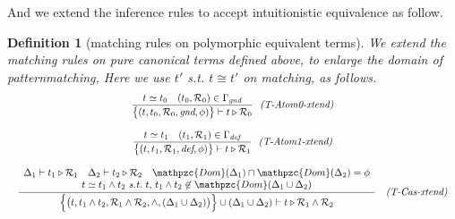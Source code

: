 \documentclass[12pt]{article}
\newtheorem{Definition}{Definition}[section]
\begin{document}
And we extend the inference rules to accept intuitionistic equivalence
as follow.

\begin{Definition}[matching rules on polymorphic equivalent terms]
  We extend the matching rules on pure canonical terms defined above, to
  enlarge the domain of patternmatching,
  Here we use $t'$ s.t. $t \cong t'$ on matching, as follows.
  \begin{displaymath}
    \begin{array}{c}
      
      \begin{array}{rl}
        \dfrac{
          t \simeq t_0
           \quad (t_0, \mathcal{R}_0) \in \Gamma_\text{\it gnd}
        }{
          \bigl\{(t, t_0, \mathcal{R}_0, \text{\it gnd}, \phi ) \bigr\}
           \vdash t \triangleright \mathcal{R}_0
        }  &  \!\!\text{\it (T-Atom0-xtend)}
      \end{array}  \\
      \\
      
      \begin{array}{rl}
        \dfrac{
          t \simeq t_1
           \quad (t_1, \mathcal{R}_1) \in \Gamma_\text{\it def}
        }{
          \bigl\{(t, t_1, \mathcal{R}_1, \text{\it def}, \phi ) \bigr\}
           \vdash t \triangleright \mathcal{R}_1
        }  &  \!\!\text{\it (T-Atom1-xtend)}
      \end{array}  \\
      \\
      
      \begin{array}{rl}
        \dfrac{
          \begin{array}{c}
            \Delta_1 \vdash t_1 \triangleright \mathcal{R}_1
            \quad \Delta_2 \vdash t_2 \triangleright \mathcal{R}_2
            \quad \mathpzc{Dom}(\Delta_1) \cap \mathpzc{Dom}(\Delta_2)
            = \phi  \\
            t \simeq t_1 \wedge t_2\
            \text{\it s.t.}\ t,\, t_1 \wedge t_2 \not\in \mathpzc{Dom}(
            \Delta_1 \cup \Delta_2)
          \end{array}
        }{
          \Bigl\{\bigl(t, t_1 \wedge t_2,
          \mathcal{R}_1 \wedge \mathcal{R}_2, \wedge,
          (\Delta_1 \cup \Delta_2) \bigr) \Bigr\}
          \cup (\Delta_1 \cup \Delta_2) \vdash
          t \triangleright \mathcal{R}_1 \wedge \mathcal{R}_2
        }  &  \text{\it (T-Cas-xtend)}
      \end{array}  \\
      \\
      

\end{array}
\end{displaymath}
\end{Definition}
\end{document}
